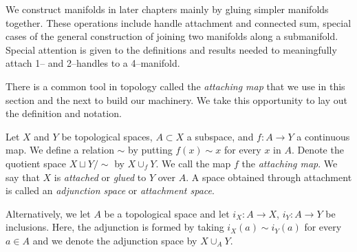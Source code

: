 %	
%
%

We construct manifolds in later chapters mainly by gluing simpler manifolds together.
These operations include handle attachment and connected sum, special cases of the general construction of joining two manifolds along a submanifold.
Special attention is given to the definitions and results needed to meaningfully attach 1-- and 2--handles to a 4--manifold.

There is a common tool in topology called the \emph{attaching map} that we use in this section and the next to build our machinery.
We take this opportunity to lay out the definition and notation.

\begin{defn}
  Let $X$ and $Y$ be topological spaces, $A\subset X$ a subspace, and $f:A\to Y$ a continuous map.
  We define a relation $\sim$ by putting $f(x)\sim x$ for every $x$ in $A$.
  Denote the quotient space $X\sqcup Y/\sim$ by $X\cup_f Y$.
  We call the map $f$ the \emph{attaching map}.  
  We say that $X$ is \emph{attached} or \emph{glued} to $Y$ over $A$.
  A space obtained through attachment is called an \emph{adjunction space} or \emph{attachment space}.
  
  Alternatively, we let $A$ be a topological space and let $i_X:A\to X$, $i_Y:A\to Y$ be inclusions.
  Here, the adjunction is formed by taking $i_X(a)\sim i_Y(a)$ for every $a\in A$ and we denote the adjunction space by $X\cup_A Y$.
\end{defn}

